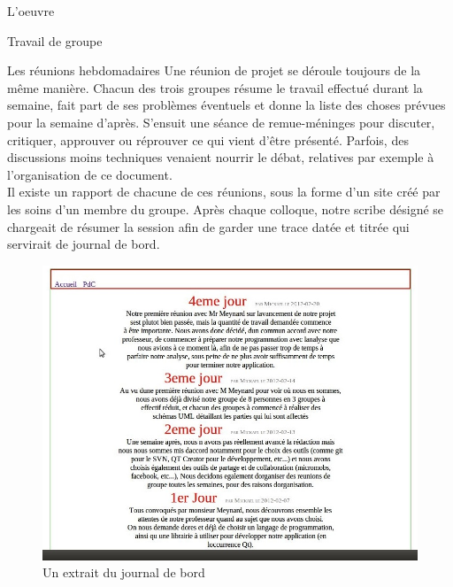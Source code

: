 \documentclass[a4paper, 12pt]{report}
\begin{document}
\begin{part}{L'oeuvre}
\begin{chapter}{Travail de groupe}
\begin{section}{Les réunions hebdomadaires}
				Une réunion de projet se déroule toujours de la même manière. Chacun des trois groupes résume le travail effectué durant la semaine,
				fait part de ses problèmes éventuels et donne la liste des choses prévues pour la semaine d'après.
				S'ensuit une séance de remue-méninges pour discuter, critiquer, approuver ou réprouver ce qui vient d'être présenté.
				Parfois, des discussions moins techniques venaient nourrir le débat, relatives par exemple à l'organisation de ce document.\\

				Il existe un rapport de chacune de ces réunions, sous la forme d'un site créé par les soins d'un membre du groupe.
				Après chaque colloque, notre scribe désigné se chargeait de résumer la session afin de garder une trace datée et titrée qui
				servirait de journal de bord.

				\begin{figure}[ht]
					\begin{center}
						\includegraphics[width=18cm]{images/journal.jpg}
						\caption{Un extrait du journal de bord}
					\end{center}
				\end{figure}~\\


\end{section}
\end{chapter}
\end{part}
\end{document}
